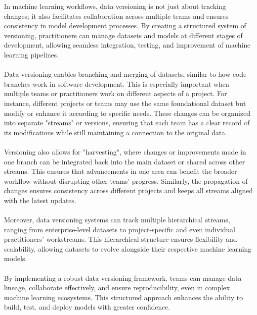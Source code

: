 In machine learning workflows, data versioning is not just 
about tracking changes; it also facilitates collaboration 
across multiple teams and ensures consistency in model 
development processes. By creating a structured system of 
versioning, practitioners can manage datasets and models at 
different stages of development, allowing seamless integration, 
testing, and improvement of machine learning pipelines.
\cite{wandb, opendatascience}
\\\\
Data versioning enables branching and merging of datasets, 
similar to how code branches work in software development. This 
is especially important when multiple teams or practitioners work 
on different aspects of a project. For instance, different projects 
or teams may use the same foundational dataset but modify or enhance 
it according to specific needs. These changes can be organized 
into separate "streams" or versions, ensuring that each team 
has a clear record of its modifications while still maintaining 
a connection to the original data.
\cite{wandb, opendatascience}
\\\\
Versioning also allows for "harvesting", where changes or 
improvements made in one branch can be integrated back into the 
main dataset or shared across other streams. This ensures that 
advancements in one area can benefit the broader workflow 
without disrupting other teams' progress. Similarly, the 
propagation of changes ensures consistency across different 
projects and keeps all streams aligned with the latest updates.
\cite{opendatascience, aimultiple}
\\\\
Moreover, data versioning systems can track multiple 
hierarchical streams, ranging from enterprise-level datasets 
to project-specific and even individual practitioners' 
workstreams. This hierarchical structure ensures flexibility 
and scalability, allowing datasets to evolve alongside their 
respective machine learning models.
\cite{opendatascience, aimultiple}
\\\\
By implementing a robust data versioning framework, teams can 
manage data lineage, collaborate effectively, and ensure 
reproducibility, even in complex machine learning ecosystems. 
This structured approach enhances the ability to build, test, 
and deploy models with greater confidence.
\cite{opendatascience, aimultiple}

